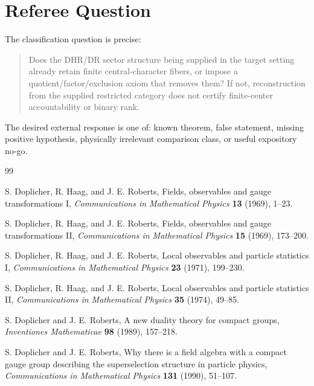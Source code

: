 \documentclass[12pt]{article}
\theoremstyle{remark}
\begin{document}
\section{Referee Question}

The classification question is precise:

\begin{quote}
Does the DHR/DR sector structure being supplied in the target setting already
retain finite central-character fibers, or impose a quotient/factor/exclusion
axiom that removes them?  If not, reconstruction from the supplied restricted
category does not certify finite-center accountability or binary rank.
\end{quote}

The desired external response is one of: known theorem, false statement,
missing positive hypothesis, physically irrelevant comparison class, or useful
expository no-go.

\begin{thebibliography}{99}

S. Doplicher, R. Haag, and J. E. Roberts,
Fields, observables and gauge transformations I,
\emph{Communications in Mathematical Physics} \textbf{13} (1969), 1--23.

S. Doplicher, R. Haag, and J. E. Roberts,
Fields, observables and gauge transformations II,
\emph{Communications in Mathematical Physics} \textbf{15} (1969), 173--200.

S. Doplicher, R. Haag, and J. E. Roberts,
Local observables and particle statistics I,
\emph{Communications in Mathematical Physics} \textbf{23} (1971), 199--230.

S. Doplicher, R. Haag, and J. E. Roberts,
Local observables and particle statistics II,
\emph{Communications in Mathematical Physics} \textbf{35} (1974), 49--85.

S. Doplicher and J. E. Roberts,
A new duality theory for compact groups,
\emph{Inventiones Mathematicae} \textbf{98} (1989), 157--218.

S. Doplicher and J. E. Roberts,
Why there is a field algebra with a compact gauge group describing the
superselection structure in particle physics,
\emph{Communications in Mathematical Physics} \textbf{131} (1990), 51--107.

\end{thebibliography}
\end{document}
